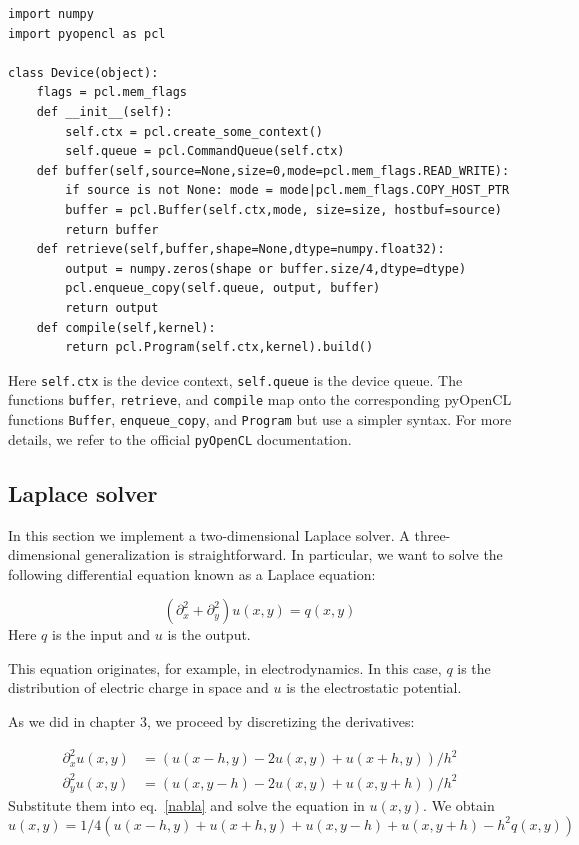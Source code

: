 \documentclass[justified,sixbynine]{tufte-book}
\def\ft{\small\tt}
\theoremstyle{plain}%
\theoremstyle{definition}
\theoremstyle{remark}
\begin{document}
\begin{fullwidth}
\begin{lstlisting}
import numpy
import pyopencl as pcl

class Device(object):
    flags = pcl.mem_flags
    def __init__(self):
        self.ctx = pcl.create_some_context()
        self.queue = pcl.CommandQueue(self.ctx)
    def buffer(self,source=None,size=0,mode=pcl.mem_flags.READ_WRITE):
        if source is not None: mode = mode|pcl.mem_flags.COPY_HOST_PTR
        buffer = pcl.Buffer(self.ctx,mode, size=size, hostbuf=source)
        return buffer
    def retrieve(self,buffer,shape=None,dtype=numpy.float32):
        output = numpy.zeros(shape or buffer.size/4,dtype=dtype)
        pcl.enqueue_copy(self.queue, output, buffer)
        return output
    def compile(self,kernel):
        return pcl.Program(self.ctx,kernel).build()
\end{lstlisting}

Here {\ft self.ctx} is the device context, {\ft self.queue} is the device queue. The functions {\ft buffer}, {\ft retrieve}, and {\ft compile} map onto the corresponding pyOpenCL functions {\ft Buffer}, {\ft enqueue\_copy}, and {\ft Program} but use a simpler syntax. For more details, we refer to the official {\ft pyOpenCL} documentation.

\subsection{Laplace solver}

In this section we implement a two-dimensional Laplace solver. A three-dimensional generalization is straightforward. In particular, we want to solve the following differential equation known as a Laplace equation:

\begin{equation}
(\partial_x^2 + \partial_y^2) u(x,y) = q(x,y)
\label{nabla}
\end{equation}
Here $q$ is the input and $u$ is the output.

This equation originates, for example, in electrodynamics. In this case, $q$ is the distribution of electric charge in space and $u$ is the electrostatic potential.

As we did in chapter 3, we proceed by discretizing the derivatives:

\begin{align}
\partial_x^2 u(x,y) &= (u(x-h,y)-2 u(x,y)+u(x+h,y))/h^2 \\
\partial_y^2 u(x,y) &= (u(x,y-h)-2 u(x,y)+u(x,y+h))/h^2
\end{align}
Substitute them into eq.~\ref{nabla} and solve the equation in $u(x,y)$. We obtain
\begin{equation}
u(x,y) = 1/4 (u(x-h,y)+u(x+h,y)+u(x,y-h)+u(x,y+h)-h^2 q(x,y))
\label{nabla2}
\end{equation}


\end{fullwidth}
\end{document}
